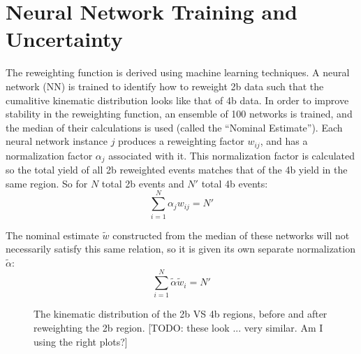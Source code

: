 \section{Neural Network Training and Uncertainty}

    The reweighting function is derived using machine learning techniques.
    A neural network (NN) is trained to identify how to reweight 2b data such that the cumalitive kinematic distribution looks like that of 4b data.
    In order to improve stability in the reweighting function,
        an ensemble of 100 networks is trained, and the median of their calculations is used (called the ``Nominal Estimate'').
    Each neural network instance $j$ produces a reweighting factor $w_{ij}$, and has a normalization factor $\alpha_j$ associated with it.
    This normalization factor is calculated so the total yield of all 2b reweighted events matches that of the 4b yield in the same region. 
    So for $N$ total 2b events and $N'$ total 4b events:
        \begin{equation}
        \sum_{i=1}^{N} \alpha_j w_{ij} = N'
        \end{equation}

    The nominal estimate $\tilde{w}$ constructed from the median of these networks will not necessarily satisfy this same relation,
        so it is given its own separate normalization $\tilde \alpha$:
        \begin{equation}
        \sum_{i=1}^{N} \tilde \alpha \tilde w_i = N'
        \end{equation}

    \begin{figure}[!htbp]
        \caption{
            The \mhh kinematic distribution of the 2b VS 4b regions, before and after reweighting the 2b region.
            [TODO: these look ... very similar. Am I using the right plots?]
        }
        \label{fig:data_mhh_reweight}
    \end{figure}

